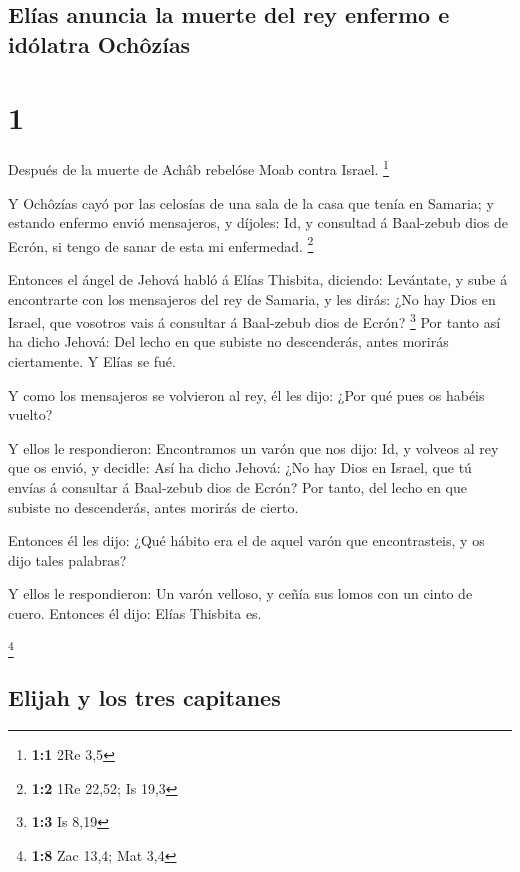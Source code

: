 \hypertarget{eluxedas-anuncia-la-muerte-del-rey-enfermo-e-iduxf3latra-ochuxf4zuxedas}{%
\subsection{Elías anuncia la muerte del rey enfermo e idólatra
Ochôzías}\label{eluxedas-anuncia-la-muerte-del-rey-enfermo-e-iduxf3latra-ochuxf4zuxedas}}

\hypertarget{section}{%
\section{1}\label{section}}

 Después de la muerte de Achâb rebelóse Moab contra Israel.
\footnote{\textbf{1:1} 2Re 3,5}

 Y Ochôzías cayó por las celosías de una sala de la casa que
tenía en Samaria; y estando enfermo envió mensajeros, y díjoles: Id, y
consultad á Baal-zebub dios de Ecrón, si tengo de sanar de esta mi
enfermedad. \footnote{\textbf{1:2} 1Re 22,52; Is 19,3}

 Entonces el ángel de Jehová habló á Elías Thisbita,
diciendo: Levántate, y sube á encontrarte con los mensajeros del rey de
Samaria, y les dirás: ¿No hay Dios en Israel, que vosotros vais á
consultar á Baal-zebub dios de Ecrón? \footnote{\textbf{1:3} Is 8,19}
 Por tanto así ha dicho Jehová: Del lecho en que subiste no
descenderás, antes morirás ciertamente. Y Elías se fué.

 Y como los mensajeros se volvieron al rey, él les dijo:
¿Por qué pues os habéis vuelto?

 Y ellos le respondieron: Encontramos un varón que nos dijo:
Id, y volveos al rey que os envió, y decidle: Así ha dicho Jehová: ¿No
hay Dios en Israel, que tú envías á consultar á Baal-zebub dios de
Ecrón? Por tanto, del lecho en que subiste no descenderás, antes morirás
de cierto.

 Entonces él les dijo: ¿Qué hábito era el de aquel varón que
encontrasteis, y os dijo tales palabras?

 Y ellos le respondieron: Un varón velloso, y ceñía sus
lomos con un cinto de cuero. Entonces él dijo: Elías Thisbita es.

\footnote{\textbf{1:8} Zac 13,4; Mat 3,4}

\hypertarget{elijah-y-los-tres-capitanes}{%
\subsection{Elijah y los tres
capitanes}\label{elijah-y-los-tres-capitanes}}

